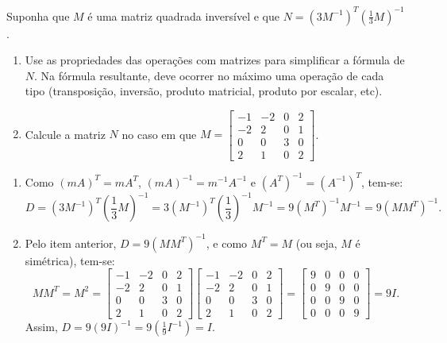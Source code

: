 \documentclass[12pt,a4paper]{article}
\begin{document}
\begin{ExerciseList}
\Exercise[title={2,0}] Suponha que $M$ é uma matriz quadrada inversível e que $N = \left(3 M^{-1}\right)^T\left(\frac{1}{3}M\right)^{-1}$.
\begin{enumerate}
\item Use as propriedades das operações com matrizes para simplificar a fórmula de $N$. Na fórmula resultante, deve ocorrer no máximo uma operação de cada tipo (transposição, inversão, produto matricial, produto por escalar, etc).
\item Calcule a matriz $N$ no caso em que $M =
\begin{bmatrix}
-1 & -2 & 0 & 2\\
-2 &  2 & 0 & 1\\
 0 &  0 & 3 & 0\\
 2 &  1 & 0 & 2
\end{bmatrix}$.
\end{enumerate}

\Answer
\begin{enumerate}
\item Como $(mA)^T = mA^T$, $(mA)^{-1} = m^{-1}A^{-1}$ e $(A^T)^{-1} = (A^{-1})^T$, tem-se:
\[
D = \left(3 M^{-1}\right)^T\left(\frac{1}{3}M\right)^{-1}
  = 3 \left(M^{-1}\right)^T \left(\frac{1}{3}\right)^{-1} M^{-1}
  = 9 \left(M^T\right)^{-1} M^{-1}
  = 9 \left(M M^T \right)^{-1}.
\]

\item Pelo item anterior, $D = 9 \left(M M^T \right)^{-1}$, e como $M^T = M$ (ou seja, $M$ é simétrica), tem-se:
\[
M M^T
= M^2
= \begin{bmatrix}
-1 & -2 & 0 & 2\\
-2 &  2 & 0 & 1\\
 0 &  0 & 3 & 0\\
 2 &  1 & 0 & 2
\end{bmatrix}
\begin{bmatrix}
-1 & -2 & 0 & 2\\
-2 &  2 & 0 & 1\\
 0 &  0 & 3 & 0\\
 2 &  1 & 0 & 2
\end{bmatrix}
=
\begin{bmatrix}
9 & 0 & 0 & 0\\
0 & 9 & 0 & 0\\
0 & 0 & 9 & 0\\
0 & 0 & 0 & 9
\end{bmatrix}
= 9I.
\]
Assim, $D = 9 (9I)^{-1} = 9 \left(\frac{1}{9} I^{-1}\right) = I$.
\end{enumerate}


\end{ExerciseList}
\end{document}

